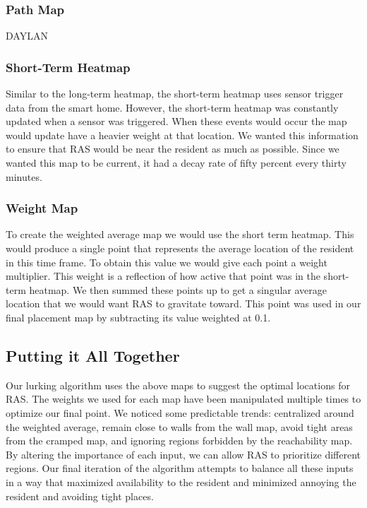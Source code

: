 \documentclass[11pt, draft, a4paper]{IEEEtran}
\begin{document}
\subsubsection{Path Map}
DAYLAN


\subsubsection{Short-Term Heatmap}
Similar to the long-term heatmap, the short-term heatmap uses sensor trigger data from the smart home. However, the short-term heatmap was constantly updated when a sensor was triggered. When these events would occur the map would update have a heavier weight at that location. We wanted this information to ensure that RAS would be near the resident as much as possible. Since we wanted this map to be current, it had a decay rate of fifty percent every thirty minutes. 


\subsubsection{Weight Map}
To create the weighted average map we would use the short term heatmap. This would produce a single point that represents the average location of the resident in this time frame. To obtain this value we would give each point a weight multiplier. This weight is a reflection of how active that point was in the short-term heatmap. We then summed these points up to get a singular average location that we would want RAS to gravitate toward. This point was used in our final placement map by subtracting its value weighted at 0.1. 


\subsection{Putting it All Together}
Our lurking algorithm uses the above maps to suggest the optimal locations for RAS. The weights we used for each map have been manipulated multiple times to optimize our final point. We noticed some predictable trends: centralized around the weighted average, remain close to walls from the wall map, avoid tight areas from the cramped map, and ignoring regions forbidden by the reachability map. By altering the importance of each input, we can allow RAS to prioritize different regions. Our final iteration of the algorithm attempts to balance all these inputs in a way that maximized availability to the resident and minimized annoying the resident and avoiding tight places.
\end{document}
